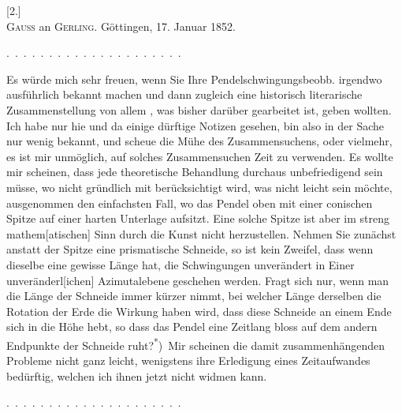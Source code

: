 \clearpage\begingroup{}
\begin{center}
[2.]\\[.7em]
\textsc{Gauss} an \textsc{Gerling}. Göttingen, 17. Januar 1852.
\end{center}
\noindent .\ .\ .\ .\ .\ .\ .\ .\ .\ .\ .\ .\ .\ .\ .\ .\ .\ .\ .\ .\ .
\par\noindent\hspace*{\parindent}Es würde mich sehr freuen, wenn Sie Ihre Pendelschwingungsbeobb.
irgendwo ausführlich bekannt machen und dann zugleich eine historisch literarische
Zusammenstellung von allem , was bisher darüber gearbeitet
ist, geben wollten. Ich habe nur hie und da einige dürftige Notizen
gesehen, bin also in der Sache nur wenig bekannt, und scheue die Mühe des
Zusammensuchens, oder vielmehr, es ist mir unmöglich, auf solches Zusammensuchen
Zeit zu verwenden. Es wollte mir scheinen, dass jede theoretische
Behandlung durchaus unbefriedigend sein müsse, wo nicht  gründlich mit berücksichtigt wird, was nicht leicht
sein möchte, ausgenommen den einfachsten Fall, wo das Pendel oben mit
einer conischen Spitze auf einer harten Unterlage aufsitzt. Eine solche Spitze
ist aber im streng mathem[atischen] Sinn durch die Kunst nicht herzustellen.
Nehmen Sie zunächst anstatt der Spitze eine prismatische Schneide, so ist kein
Zweifel, dass wenn dieselbe eine gewisse Länge hat, die Schwingungen unverändert
in Einer unveränderl[ichen] Azimutalebene geschehen werden. Fragt
sich nur, wenn man die Länge der Schneide immer kürzer nimmt, bei welcher
Länge derselben die Rotation der Erde die Wirkung haben wird, dass diese
Schneide an einem Ende sich in die Höhe hebt, so dass das Pendel eine
Zeitlang bloss auf dem andern Endpunkte der Schneide ruht?\textsuperscript{*})\begingroup\renewcommand{\thefootnote}{}\endgroup\ Mir scheinen
die damit zusammenhängenden Probleme nicht ganz leicht, wenigstens ihre
Erledigung eines Zeitaufwandes bedürftig, welchen ich ihnen jetzt nicht widmen
kann.
\par\noindent .\ .\ .\ .\ .\ .\ .\ .\ .\ .\ .\ .\ .\ .\ .\ .\ .\ .\ .\ .\ .
\HistoricalFoot{}{5\textsuperscript{*}}
\clearpage\endgroup
